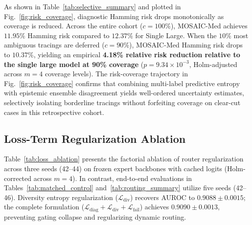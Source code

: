 \documentclass{ICIC2026}
\begin{document}
As shown in Table~\ref{tab:selective_summary} and plotted in Fig.~\ref{fig:risk_coverage}, diagnostic Hamming risk drops monotonically as coverage is reduced. Across the entire cohort ($c=100\%$), MOSAIC-Med achieves $11.95\%$ Hamming risk compared to $12.37\%$ for Single Large. When the $10\%$ most ambiguous tracings are deferred ($c=90\%$), MOSAIC-Med Hamming risk drops to $10.37\%$, yielding an empirical \textbf{4.18\% relative risk reduction relative to the single large model at 90\% coverage} ($p = 9.34 \times 10^{-3}$, Holm-adjusted across $m=4$ coverage levels). The risk-coverage trajectory in Fig.~\ref{fig:risk_coverage} confirms that combining multi-label predictive entropy with epistemic ensemble disagreement yields well-ordered uncertainty estimates, selectively isolating borderline tracings without forfeiting coverage on clear-cut cases in this retrospective cohort.

\subsection{Loss-Term Regularization Ablation}
\label{subsec:res_ablation}

Table~\ref{tab:loss_ablation} presents the factorial ablation of router regularization across three seeds (42--44) on frozen expert backbones with cached logits (Holm-corrected across $m=4$). In contrast, end-to-end evaluations in Tables~\ref{tab:matched_control} and~\ref{tab:routing_summary} utilize five seeds (42--46). Diversity entropy regularization ($\mathcal{L}_{\text{div}}$) recovers AUROC to $0.9088 \pm 0.0015$; the complete formulation ($\mathcal{L}_{\text{diag}} + \mathcal{L}_{\text{div}} + \mathcal{L}_{\text{fail}}$) achieves $0.9090 \pm 0.0013$, preventing gating collapse and regularizing dynamic routing.
\end{document}
